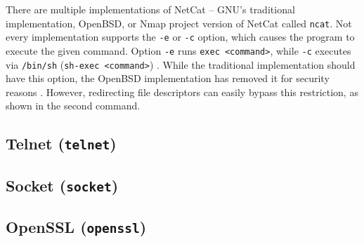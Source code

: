 There are multiple implementations of NetCat -- GNU's traditional implementation, OpenBSD, or Nmap project version of NetCat called \texttt{ncat}. Not every implementation supports the \texttt{-e} or \texttt{-c} option, which causes the program to execute the given command. Option \texttt{-e} runs \texttt{exec <command>}, while \texttt{-c} executes via \texttt{/bin/sh} (\texttt{sh-exec <command>}) \cite{ncat-man}. While the traditional implementation should have this option, the OpenBSD implementation has removed it for security reasons \cite{nc-man}. However, redirecting file descriptors can easily bypass this restriction, as shown in the second command.






\subsection{Telnet (\texttt{telnet})} \label{telnet}






\subsection{Socket (\texttt{socket})}



\subsection{OpenSSL (\texttt{openssl})}


